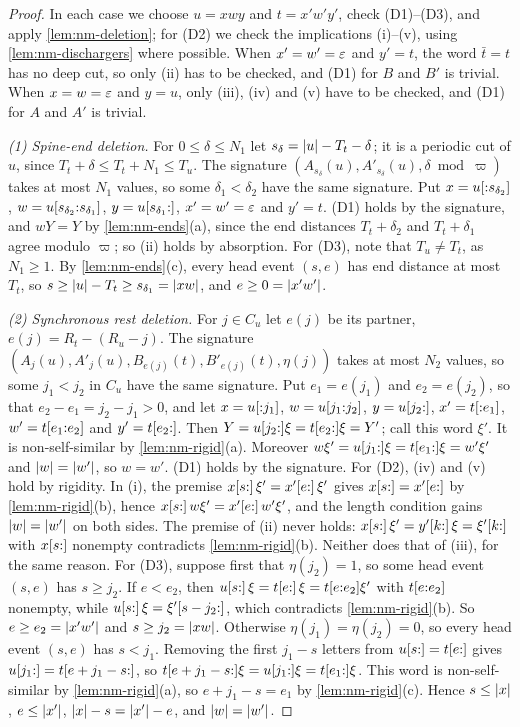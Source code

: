 \begin{proof}
In each case we choose $u=xwy$ and $t=x'w'y'$, check (D1)--(D3), and apply
\cref{lem:nm-deletion}; for (D2) we check the implications (i)--(v), using
\cref{lem:nm-dischargers} where possible. When $x'=w'=\varepsilon$ and $y'=t$, the
word $\bar t=t$ has no deep cut, so only (ii) has to be checked, and (D1) for
$B$ and $B'$ is trivial. When $x=w=\varepsilon$ and $y=u$, only (iii), (iv) and (v)
have to be checked, and (D1) for $A$ and $A'$ is trivial.

\emph{(1) Spine-end deletion.} For $0\le\delta\le N_1$ let
$s_\delta=\lvert u\rvert-T_t-\delta$; it is a periodic cut of $u$, since
$T_t+\delta\le T_t+N_1\le T_u$. The signature
$(A_{s_\delta}(u),A'_{s_\delta}(u),\delta\bmod \varpi)$ takes at most $N_1$
values, so some $\delta_1<\delta_2$ have the same signature. Put
$x=u[{:}s_{\delta_2}]$, $w=u[s_{\delta_2}{:}s_{\delta_1}]$,
$y=u[s_{\delta_1}{:}]$, $x'=w'=\varepsilon$ and $y'=t$. (D1) holds by the
signature, and $wY=Y$ by \cref{lem:nm-ends}(a), since the end distances
$T_t+\delta_2$ and $T_t+\delta_1$ agree modulo $\varpi$; so (ii) holds by
absorption. For (D3), note that $T_u\ne T_t$, as $N_1\ge1$. By
\cref{lem:nm-ends}(c), every head event $(s,e)$ has end distance at most $T_t$,
so
$s\ge\lvert u\rvert-T_t\ge s_{\delta_1}=\lvert xw\rvert$, and $e\ge0=\lvert x'w'\rvert$.

\emph{(2) Synchronous rest deletion.} For $j\in C_u$ let $e(j)$ be its partner,
$e(j)=R_t-(R_u-j)$. The signature
$(A_j(u),A'_j(u),B_{e(j)}(t),B'_{e(j)}(t),\eta(j))$ takes at most $N_2$
values, so some $j_1<j_2$ in $C_u$ have the same signature. Put $e_1=e(j_1)$ and
$e_2=e(j_2)$, so that $e_2-e_1=j_2-j_1>0$, and let $x=u[{:}j_1]$,
$w=u[j_1{:}j_2]$, $y=u[j_2{:}]$, $x'=t[{:}e_1]$,
$w'=t[e_1{:}e_2]$ and $y'=t[e_2{:}]$. Then
$Y=u[j_2{:}]\xi=t[e_2{:}]\xi=Y'$; call this word $\xi'$. It is
non-self-similar by \cref{lem:nm-rigid}(a). Moreover
$w\xi'=u[j_1{:}]\xi=t[e_1{:}]\xi=w'\xi'$ and $\lvert w\rvert=\lvert w'\rvert$, so $w=w'$. (D1)
holds by the signature. For (D2), (iv) and (v) hold by rigidity. In (i), the
premise $x[s{:}]\,\xi'=x'[e{:}]\,\xi'$ gives $x[s{:}]=x'[e{:}]$ by
\cref{lem:nm-rigid}(b), hence $x[s{:}]\,w\xi'=x'[e{:}]\,w'\xi'$, and the length
condition gains $\lvert w\rvert=\lvert w'\rvert$ on both sides. The premise of (ii) never
holds: $x[s{:}]\,\xi'=y'[k{:}]\,\xi=\xi'[k{:}]$ with $x[s{:}]$ nonempty
contradicts \cref{lem:nm-rigid}(b). Neither does that of (iii), for the same
reason. For (D3), suppose first that $\eta(j_2)=1$, so some head event $(s,e)$
has $s\ge j_2$. If $e<e_2$, then $u[s{:}]\,\xi=t[e{:}]\,\xi=t[e{:}e_2]\xi'$
with $t[e{:}e_2]$ nonempty, while $u[s{:}]\,\xi=\xi'[s-j_2{:}]$, which
contradicts \cref{lem:nm-rigid}(b). So $e\ge e_2=\lvert x'w'\rvert$ and
$s\ge j_2=\lvert xw\rvert$. Otherwise $\eta(j_1)=\eta(j_2)=0$, so every head event
$(s,e)$ has $s<j_1$. Removing the first $j_1-s$ letters from
$u[s{:}]=t[e{:}]$ gives $u[j_1{:}]=t[e+j_1-s{:}]$, so
$t[e+j_1-s{:}]\xi=u[j_1{:}]\xi=t[e_1{:}]\xi$. This word is
non-self-similar by \cref{lem:nm-rigid}(a), so $e+j_1-s=e_1$ by
\cref{lem:nm-rigid}(c). Hence $s\le\lvert x\rvert$, $e\le\lvert x'\rvert$,
$\lvert x\rvert-s=\lvert x'\rvert-e$, and $\lvert w\rvert=\lvert w'\rvert$.


\end{proof}

